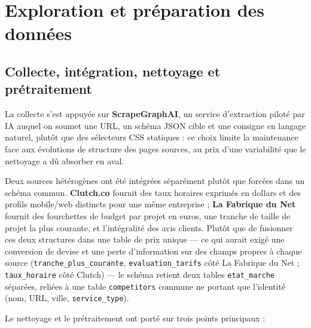 \section{Exploration et préparation des données}

\subsection{Collecte, intégration, nettoyage et prétraitement}

La collecte s'est appuyée sur \textbf{ScrapeGraphAI}, un service d'extraction piloté par IA auquel on soumet une URL,
un schéma JSON cible et une consigne en langage naturel, plutôt que des sélecteurs CSS statiques : ce choix
limite la maintenance face aux évolutions de structure des pages sources, au prix d'une variabilité que le
nettoyage a dû absorber en aval.

Deux sources hétérogènes ont été intégrées séparément plutôt que forcées dans un schéma commun.
\textbf{Clutch.co} fournit des taux horaires exprimés en dollars et des profils mobile/web distincts pour une
même entreprise ; \textbf{La Fabrique du Net} fournit des fourchettes de budget par projet en euros, une
tranche de taille de projet la plus courante, et l'intégralité des avis clients. Plutôt que de fusionner ces
deux structures dans une table de prix unique --- ce qui aurait exigé une conversion de devise et une perte
d'information sur des champs propres à chaque source (\texttt{tranche\_plus\_courante},
\texttt{evaluation\_tarifs} côté La Fabrique du Net ; \texttt{taux\_horaire} côté Clutch) --- le schéma
retient deux tables \texttt{etat\_marche} séparées, reliées à une table \texttt{competitors} commune ne
portant que l'identité (nom, URL, ville, \texttt{service\_type}).

Le nettoyage et le prétraitement ont porté sur trois points principaux :

